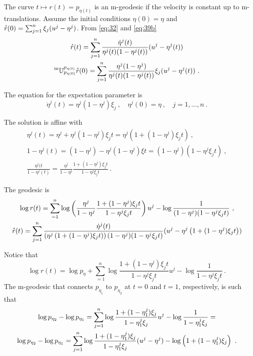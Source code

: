 \documentclass[12pt,a4paper]{amsart}
\begin{document}
The curve $t \mapsto r(t) = p_{\eta(t)}$ is an m-geodesic if the velocity is constant up to m-translations. Assume the initial conditions $\eta(0) = \eta$ and $\accentset{\star}{r}(0) = \sum_{j=1}^n \xi_j(u^j - \eta^j)$. From \cref{eq:32} and \cref{eq:39b}
\begin{gather}
  \label{eq:40}
  \accentset{\star}{r}(t) =  \sum_{j=1}^n \frac{\dot \eta^j(t)}{\eta^j(t)(1 - \eta^j(t))} (u^j - \eta^j(t)) \\
\prescript{\text{m}}{} {\mathbb U} _ {p_{\eta(0)}} ^ {p_{\eta(t)}} \accentset{\star}{r}(0) =  \sum_{j=1}^n \frac{\eta^j(1-\eta^j)} {\eta^j(t)(1-\eta^j(t))} \xi_j (u^j - \eta^j(t)) \ .
\end{gather}

The equation for the expectation parameter is
\begin{equation}
  \label{eq:41}
  \dot \eta^j(t) = \eta^j(1-\eta^j) \xi_j \ , \quad \eta^j(0) = \eta \ , \quad j = 1,\dots,n \ .
\end{equation}

The solution is affine with
\begin{gather}
  \label{eq:44}
  \eta^j(t) = \eta^j + \eta^j(1-\eta^j) \xi_j t = \eta^j\left (1 + (1-\eta^j) \xi_j t\right) \ ,\\
  1 - \eta^j(t) = (1 - \eta^j) - \eta^j(1-\eta^j) \xi t = (1 - \eta^j)(1 -\eta^j\xi_j t) \ , \\
  \frac{\eta^j(t}{1-\eta^j(t)} = \frac{\eta^j}{1-\eta^j} \frac{1 + (1-\eta^j) \xi_j t}{1 -\eta^j\xi_j t} \ .
\end{gather}

The geodesic is
\begin{gather}
  \label{eq:42}
  \log r(t) = \sum_{=1}^n \log\left(\frac{\eta^j}{1-\eta^j} \frac{1 + (1-\eta^j) \xi_j t}{1 -\eta^j\xi_j t}\right) u^j - \log \frac1{(1 - \eta^j)(1 -\eta^j\xi_j t)} \ , \\
  \accentset{\star}{r}(t) = \sum_{j=1}^n \frac{\dot \eta^j(t)}{\left(\eta^j\left (1 + (1-\eta^j) \xi_j t\right)\right)(1 - \eta^j)(1 -\eta^j\xi_j t)} (u^j - \eta^j\left (1 + (1-\eta^j) \xi_j t\right))
\end{gather}

Notice that
\begin{equation}
  \label{eq:45}
   \log r(t) = \log p_\eta + \sum_{=1}^n \log \frac{1 + (1-\eta^j) \xi_j t}{1 -\eta^j\xi_j t} u^j - \log \frac1{1 -\eta^j\xi_j t} \ . 
 \end{equation}
 The m-geodesic that connects $p_{\eta_1}$ to $p_{\eta_2}$ at $t=0$ and $t=1$, respectively, is such that
 \begin{multline}
   \label{eq:46}
   \log p_{\eta_2} - \log p_{\eta_1} = \sum_{j=1}^n \log \frac{1 + (1-\eta^j_1) \xi_j}{1 -\eta^j_1\xi_j} u^j - \log \frac1{1 -\eta^j_1\xi_j} =  \\
 \log p_{\eta_2} - \log p_{\eta_1} = \sum_{j=1}^n \log \frac{1 + (1-\eta^j_1) \xi_j}{1 -\eta^j_1\xi_j} (u^j - \eta^j)- \log\left(1 + (1-\eta^j_1) \xi_j\right)  \ .
 \end{multline}
\end{document}
